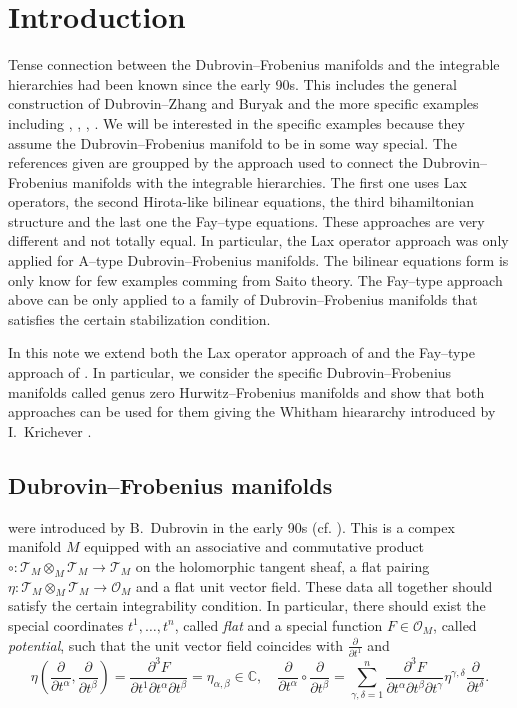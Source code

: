 \documentclass[12pt,a4paper]{amsart}
\newcommand{\CC}{{\mathbb{C}}}
\def\O{{\mathcal O}}
\def\T{{\mathcal T}}
\newcommand{\p}{{\partial}}
\newcommand{\<}{\left<}
\renewcommand{\>}{\right>}
\numberwithin{equation}{section}
\begin{document}
\section{Introduction}
Tense connection between the Dubrovin--Frobenius manifolds and the integrable hierarchies had been known since the early 90s. This includes the general construction of Dubrovin--Zhang \cite{DZ} and Buryak \cite{Bu} and the more specific examples including \cite{DVV,D1}, \cite{FGM, MT}, \cite{LRZ, FSZ, DLZ}, \cite{BDbN,B22,B24}.
We will be interested in the specific examples because they assume the Dubrovin--Frobenius manifold to be in some way special.
The references given are groupped by the approach used to connect the Dubrovin--Frobenius manifolds with the integrable hierarchies. The first one uses Lax operators, the second Hirota-like bilinear equations, the third bihamiltonian structure and the last one the Fay--type equations. These approaches are very different and not totally equal. In particular, the Lax operator approach was only applied for A--type Dubrovin--Frobenius manifolds. The bilinear equations form is only know for few examples comming from Saito theory. The Fay--type approach above can be only applied to a family of Dubrovin--Frobenius manifolds that satisfies the certain stabilization condition.

In this note we extend both the Lax operator approach of \cite{DVV,D1} and the Fay--type approach of \cite{BDbN}. In particular, we consider the specific Dubrovin--Frobenius manifolds called genus zero Hurwitz--Frobenius manifolds and show that both approaches can be used for them giving the Whitham hieararchy introduced by I.~Krichever \cite{K94}.

\subsection*{Dubrovin--Frobenius manifolds} were introduced by B.~Dubrovin in the early 90s (cf. \cite{D2}). This is a compex manifold $M$ equipped with an associative and commutative product $\circ: \T_M \otimes_M \T_M \to \T_M$ on the holomorphic tangent sheaf, a flat pairing $\eta: \T_M \otimes_M \T_M \to \O_M$ and a flat unit vector field. These data all together should satisfy the certain integrability condition. In particular, there should exist the special coordinates $t^1,\dots,t^n$, called \textit{flat} and a special function $F \in \O_M$, called \textit{potential}, such that the unit vector field coincides with $\frac{\p}{\p t^1}$ and
\[
    \eta( \frac{\p}{\p t^\alpha},\frac{\p}{\p t^\beta}) = \frac{\p^3 F}{\p t^1 \p t^\alpha \p t^\beta }  = \eta_{\alpha,\beta} \in \CC,
    \quad
    \frac{\p}{\p t^\alpha} \circ \frac{\p}{\p t^\beta} = \sum_{\gamma,\delta=1}^n \frac{\p^3 F}{\p t^\alpha \p t^\beta \p t^\gamma} \eta^{\gamma,\delta} \frac{\p}{\p t^\delta}.
\]
\end{document}
